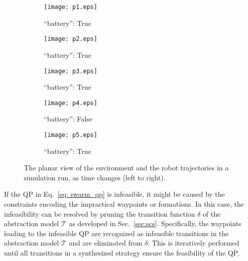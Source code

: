 \documentclass[letterpaper, 10 pt, conference]{ieeeconf}
\begin{document}
\begin{figure*}[htbp]
     \centering
     \vspace{0.2cm}
     \begin{subfigure}[b]{0.18\textwidth}
         \centering
         \texttt{[image: p1.eps]}
         \caption{``battery'': True}
         \label{fig:f11}
     \end{subfigure}
     \hfill
     \begin{subfigure}[b]{0.18\textwidth}
         \centering
         \texttt{[image: p2.eps]}
         \caption{``battery'': True}
         \label{fig:f12}
     \end{subfigure}
     \hfill
     \begin{subfigure}[b]{0.18\textwidth}
         \centering
         \texttt{[image: p3.eps]}
         \caption{``battery'': True}
         \label{fig:f13}
     \end{subfigure}
     \hfill
     \begin{subfigure}[b]{0.18\textwidth}
         \centering
         \texttt{[image: p4.eps]}
         \caption{``battery'': False}
         \label{fig:f14}
     \end{subfigure}
     \hfill
     \begin{subfigure}[b]{0.18\textwidth}
         \centering
         \texttt{[image: p5.eps]}
         \caption{``battery'': True}
         \label{fig:f15}
     \end{subfigure}
        \caption{The planar view of the environment and the robot trajectories in a simulation run, as time changes (left to right).}
        \label{fig:f1}
        \vspace{-0.1cm}
\end{figure*}


If the QP in Eq.~\eqref{eq: swarm_qp} is infeasible, it might be caused by the constraints encoding the impractical waypoints or formations. In this case, the infeasibility can be resolved by pruning the transition function $\delta$ of the abstraction model $\mathcal{T}$ as developed in Sec.~\ref{sec:scs}. Specifically, the waypoints leading to the infeasible QP are recognized as infeasible transitions in the abstraction model $\mathcal{T}$ and are eliminated from $\delta$. This is iteratively performed until all transitions in a synthesized strategy ensure the feasibility of the QP.
\end{document}
